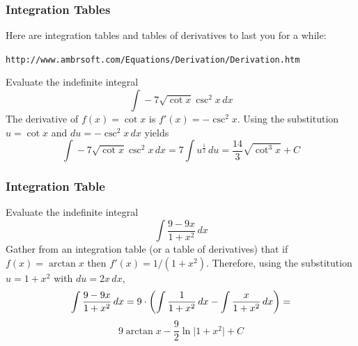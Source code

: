 \documentclass[xcolor=dvipsnames]{beamer}
\begin{document}

\begin{frame}
  \frametitle{Integration Tables}
  Here are integration tables and tables of derivatives to last you
  for a while:
\begin{alltt}
\small
http://www.ambrsoft.com/Equations/Derivation/Derivation.htm
\end{alltt}

 Evaluate the indefinite integral
\begin{equation}
  \label{eq:eewuquex}
  \int{}-7\sqrt{\cot{}x}\csc^{2}x\,dx
\end{equation}
The derivative of $f(x)=\cot{}x$ is $f'(x)=-\csc^{2}x$. Using the
substitution $u=\cot{}x$ and $du=-\csc^{2}x\,dx$ yields
\begin{equation}
  \label{eq:qualaiqu}
  \int{}-7\sqrt{\cot{}x}\csc^{2}x\,dx=7\int{}u^{\frac{1}{2}}\,du=\frac{14}{3}\sqrt{\cot^{3}x}+C
\end{equation}
\end{frame}

\begin{frame}
  \frametitle{Integration Table}
   Evaluate the indefinite integral
  \begin{equation}
    \label{eq:xohphohh}
    \int{}\frac{9-9x}{1+x^{2}}\,dx
  \end{equation}
Gather from an integration table (or a table of derivatives) that if
$f(x)=\arctan{}x$ then $f'(x)=1/(1+x^{2})$. Therefore, using the
substitution $u=1+x^{2}$ with $du=2x\,dx$,
\begin{equation}
  \label{eq:mixausho}
  \int{}\frac{9-9x}{1+x^{2}}\,dx=9\cdot\left(\int\frac{1}{1+x^{2}}\,dx-\int\frac{x}{1+x^{2}}\,dx\right)=\notag
\end{equation}
\begin{equation}
  \label{eq:ohleseej}
  9\arctan{}x-\frac{9}{2}\ln\vert{}1+x^{2}\vert{}+C
\end{equation}
\end{frame}
\end{document}
